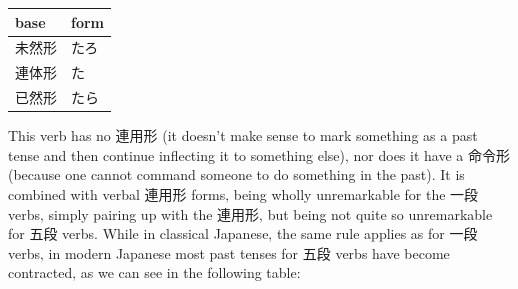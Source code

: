 \documentclass[11pt, b5paper, twoside, openright, onecolumn]{book}
\newenvironment{mytabular}[1]{\noindent\hspace{0.4in}
\begin{tabular}[h]{#1}}{\end{tabular}}
\begin{document}
\vspace{0.5cm}
\smaller
\begin{mytabular}{| l  l |}\hline 
\rule{0pt}{2.4ex}base & form\\ 
\hline
\rule{0pt}{2.4ex}未然形 & たろ\\ 
\rule{0pt}{2.4ex}連体形 & た\\ 
\rule{0pt}{2.4ex}已然形 & \index[japanese]{たら}たら\\ 
\hline 
\end{mytabular}
\larger
\vspace{0.5cm}


This verb has no 連用形 (it doesn’t make sense to mark something as a past tense and then continue inflecting it to something else)‚ nor does it have a 命令形 (because one cannot command someone to do something in the past). It is combined with verbal 連用形 forms‚ being wholly unremarkable for the 一段 verbs‚ simply pairing up with the 連用形‚ but being not quite so unremarkable for 五段 verbs. While in classical Japanese‚ the same rule applies as for 一段 verbs‚ in modern Japanese most past tenses for 五段 verbs have become contracted‚ as we can see in the following table:
\end{document}

